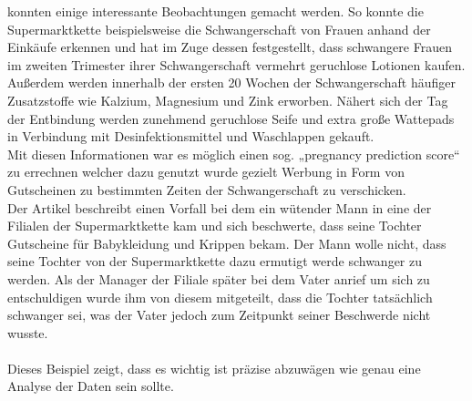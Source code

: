 konnten einige interessante Beobachtungen gemacht werden. So konnte die
Supermarktkette beispielsweise die Schwangerschaft von Frauen anhand der
Einkäufe erkennen und hat im Zuge dessen festgestellt, dass schwangere Frauen
im zweiten Trimester ihrer Schwangerschaft vermehrt geruchlose Lotionen kaufen.
Außerdem werden innerhalb der ersten 20 Wochen der Schwangerschaft häufiger
Zusatzstoffe wie Kalzium, Magnesium und Zink erworben. Nähert sich der Tag der
Entbindung werden zunehmend geruchlose Seife und extra große Wattepads in
Verbindung mit Desinfektionsmittel und Waschlappen gekauft. \\
Mit diesen Informationen war es möglich einen sog. „pregnancy prediction score“
zu errechnen welcher dazu genutzt wurde gezielt Werbung in Form von Gutscheinen
zu bestimmten Zeiten der Schwangerschaft zu verschicken. \\
Der Artikel beschreibt einen Vorfall bei dem ein wütender Mann in eine der
Filialen der Supermarktkette kam und sich beschwerte, dass seine Tochter
Gutscheine für Babykleidung und Krippen bekam. Der Mann wolle nicht, dass seine
Tochter von der Supermarktkette dazu ermutigt werde schwanger zu werden. Als
der Manager der Filiale später bei dem Vater anrief um sich zu entschuldigen
wurde ihm von diesem mitgeteilt, dass die Tochter tatsächlich schwanger sei, was der Vater
jedoch zum Zeitpunkt seiner Beschwerde nicht wusste. \\
\\
Dieses Beispiel zeigt, dass es wichtig ist präzise abzuwägen wie genau eine
Analyse der Daten sein sollte. \\
